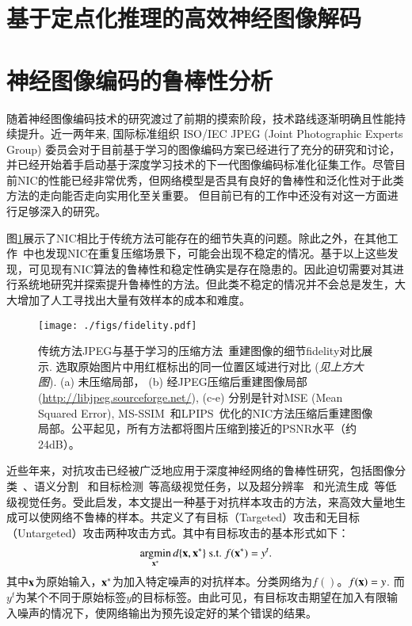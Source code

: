 \documentclass[macfonts,phd,oneside,nobackinfo]{njuthesis}
\begin{document}
\section{基于定点化推理的高效神经图像解码}
\section{神经图像编码的鲁棒性分析}
随着神经图像编码技术的研究渡过了前期的摸索阶段，技术路线逐渐明确且性能持续提升。近一两年来, 国际标准组织 ISO/IEC JPEG (Joint Photographic Experts Group) 委员会对于目前基于学习的图像编码方案已经进行了充分的研究和讨论，并已经开始着手启动基于深度学习技术的下一代图像编码标准化征集工作。尽管目前NIC的性能已经非常优秀，但网络模型是否具有良好的鲁棒性和泛化性对于此类方法的走向能否走向实用化至关重要。 但目前已有的工作中还没有对这一方面进行足够深入的研究。

图\ref{fidelity}展示了NIC相比于传统方法可能存在的细节失真的问题。除此之外，在其他工作~\cite{kim2020}中也发现NIC在重复压缩场景下，可能会出现不稳定的情况。基于以上这些发现，可见现有NIC算法的鲁棒性和稳定性确实是存在隐患的。因此迫切需要对其进行系统地研究并探索提升鲁棒性的方法。但此类不稳定的情况并不会总是发生，大大增加了人工寻找出大量有效样本的成本和难度。

\begin{figure}[t]
\centering
\texttt{[image: ./figs/fidelity.pdf]}
\caption{传统方法JPEG与基于学习的压缩方法~\cite{xxx}重建图像的细节fidelity对比展示.
选取原始图片中用红框标出的同一位置区域进行对比 ({\it 见上方大图}). (a) 未压缩局部， (b) 经JPEG压缩后重建图像局部(\url{http://libjpeg.sourceforge.net/}), (c-e) 分别是针对MSE (Mean Squared Error), MS-SSIM~\cite{MS-SSIM}和LPIPS~\cite{zhang2018unreasonable}优化的NIC方法压缩后重建图像局部。公平起见，所有方法都将图片压缩到接近的PSNR水平（约24dB）。}
\label{fidelity}
\end{figure}

近些年来，对抗攻击已经被广泛地应用于深度神经网络的鲁棒性研究，包括图像分类~\cite{43405,nguyen2015deep}、语义分割~\cite{Xiao_2018_ECCV} 和目标检测~\cite{ijcai2019-134}等高级视觉任务，以及超分辨率~\cite{yin2018sr} 和光流生成~\cite{ranjan2019attacking}等低级视觉任务。受此启发，本文提出一种基于对抗样本攻击的方法，来高效大量地生成可以使网络不鲁棒的样本。共定义了有目标（Targeted）攻击和无目标（Untargeted）攻击两种攻击方式。其中有目标攻击的基本形式如下：
\begin{align}
\mathop{\arg\!\min}_{{\bf x}^{\ast}} {d}\{{\bf x},{\bf x}^{\ast}\} \ \text{s.t.} \ f({\bf x}^{\ast}) = y^t. \label{eq:targeted_attack}
\end{align}
其中$\bf x$为原始输入，${\bf x}^{\ast}$为加入特定噪声的对抗样本。分类网络为$f()$。$f({\bf x}) = y$. 而$y^t$为某个不同于原始标签$y$的目标标签。由此可见，有目标攻击期望在加入有限输入噪声的情况下，使网络输出为预先设定好的某个错误的结果。
\end{document}
